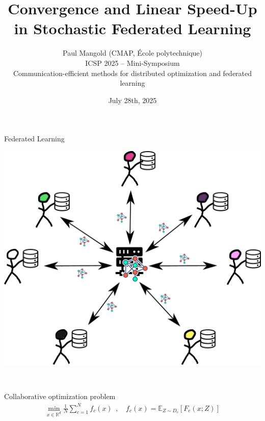 \documentclass[aspectratio=169,12pt]{beamer}
\title{\LARGE Convergence and Linear Speed-Up in Stochastic Federated Learning}
\author{
  Paul Mangold (CMAP, École polytechnique) \\[1em]
  ICSP 2025 -- Mini-Symposium\\
  \footnotesize Communication-efficient methods for distributed optimization and federated learning
}
\institute{}
\date{July 28th, 2025}
\begin{document}

\begin{frame}[plain]
  \vspace{3.5em}
  \titlepage
\end{frame}
\addtocounter{framenumber}{-1}



\begin{frame}[t]{Federated Learning}
\vspace{0.5em}
  \begin{minipage}{0.35\linewidth}
    \begin{center}
    \includegraphics[width=\linewidth]{images/federated_learning.pdf} 
    \end{center}
    
  \end{minipage}~~~~~~%
  \begin{minipage}{0.5\linewidth}

    \begin{center}
      Collaborative optimization problem
      \begin{align*}
        \min_{x \in \mathbb{R}^d} 
        \frac{1}{N} \sum_{c=1}^N f_c(x)
        ~~,
        \quad 
        f_c(x)
        = \mathbb{E}_{Z \sim D_c} [ F_c(x; Z) ]
      \end{align*}
    \end{center}
      

\end{minipage}
\end{frame}
\end{document}
